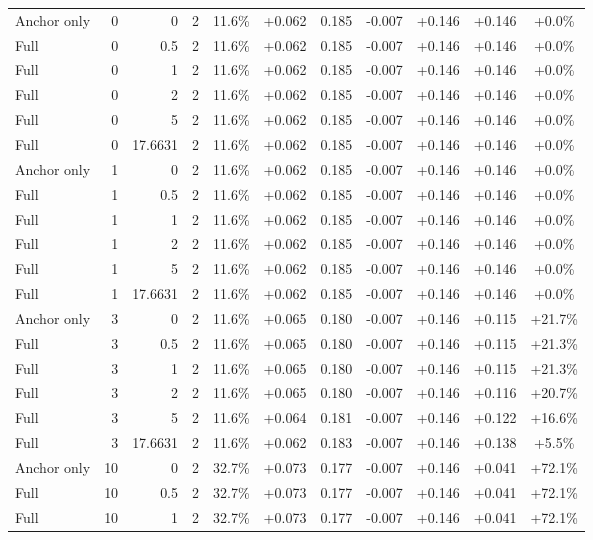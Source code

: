 \begin{table}[htbp]
\begin{tabular}{lrrrccccccc}
Anchor only & 0 & 0 & 2 & 11.6\% & +0.062 & 0.185 & -0.007 & +0.146 & +0.146 & +0.0\% \\
Full & 0 & 0.5 & 2 & 11.6\% & +0.062 & 0.185 & -0.007 & +0.146 & +0.146 & +0.0\% \\
Full & 0 & 1 & 2 & 11.6\% & +0.062 & 0.185 & -0.007 & +0.146 & +0.146 & +0.0\% \\
Full & 0 & 2 & 2 & 11.6\% & +0.062 & 0.185 & -0.007 & +0.146 & +0.146 & +0.0\% \\
Full & 0 & 5 & 2 & 11.6\% & +0.062 & 0.185 & -0.007 & +0.146 & +0.146 & +0.0\% \\
Full & 0 & 17.6631 & 2 & 11.6\% & +0.062 & 0.185 & -0.007 & +0.146 & +0.146 & +0.0\% \\
Anchor only & 1 & 0 & 2 & 11.6\% & +0.062 & 0.185 & -0.007 & +0.146 & +0.146 & +0.0\% \\
Full & 1 & 0.5 & 2 & 11.6\% & +0.062 & 0.185 & -0.007 & +0.146 & +0.146 & +0.0\% \\
Full & 1 & 1 & 2 & 11.6\% & +0.062 & 0.185 & -0.007 & +0.146 & +0.146 & +0.0\% \\
Full & 1 & 2 & 2 & 11.6\% & +0.062 & 0.185 & -0.007 & +0.146 & +0.146 & +0.0\% \\
Full & 1 & 5 & 2 & 11.6\% & +0.062 & 0.185 & -0.007 & +0.146 & +0.146 & +0.0\% \\
Full & 1 & 17.6631 & 2 & 11.6\% & +0.062 & 0.185 & -0.007 & +0.146 & +0.146 & +0.0\% \\
Anchor only & 3 & 0 & 2 & 11.6\% & +0.065 & 0.180 & -0.007 & +0.146 & +0.115 & +21.7\% \\
Full & 3 & 0.5 & 2 & 11.6\% & +0.065 & 0.180 & -0.007 & +0.146 & +0.115 & +21.3\% \\
Full & 3 & 1 & 2 & 11.6\% & +0.065 & 0.180 & -0.007 & +0.146 & +0.115 & +21.3\% \\
Full & 3 & 2 & 2 & 11.6\% & +0.065 & 0.180 & -0.007 & +0.146 & +0.116 & +20.7\% \\
Full & 3 & 5 & 2 & 11.6\% & +0.064 & 0.181 & -0.007 & +0.146 & +0.122 & +16.6\% \\
Full & 3 & 17.6631 & 2 & 11.6\% & +0.062 & 0.183 & -0.007 & +0.146 & +0.138 & +5.5\% \\
Anchor only & 10 & 0 & 2 & 32.7\% & +0.073 & 0.177 & -0.007 & +0.146 & +0.041 & +72.1\% \\
Full & 10 & 0.5 & 2 & 32.7\% & +0.073 & 0.177 & -0.007 & +0.146 & +0.041 & +72.1\% \\
Full & 10 & 1 & 2 & 32.7\% & +0.073 & 0.177 & -0.007 & +0.146 & +0.041 & +72.1\% \\

\end{tabular}
\end{table}
